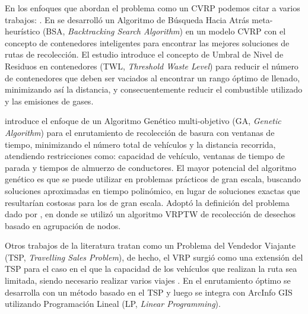 En los enfoques que abordan el problema como un CVRP podemos citar a varios trabajos: \citet{Akhtar2017BacktrackingOptimization,Ombuki-Berman2007WASTEALGORITHMS,Kim2006WasteWindows,Billa2014GISOptimization,Karadimas2007OptimalAlgorithm}. En \citet{Akhtar2017BacktrackingOptimization} se desarrolló un Algoritmo de Búsqueda Hacia Atrás meta-heurístico (BSA, \textit{Backtracking Search Algorithm}) en un modelo CVRP con el concepto de contenedores inteligentes para encontrar las mejores soluciones de rutas de recolección. El estudio introduce \citep{Akhtar2017BacktrackingOptimization, AbdullaAlMamun2015IntegratedAutomation} el concepto de Umbral de Nivel de Residuos en contenedores (TWL, \textit{Threshold Waste Level}) para reducir el número de contenedores que deben ser vaciados al encontrar un rango óptimo de llenado, minimizando así la distancia, y consecuentemente reducir el combustible utilizado y las emisiones de gases.

\citet{Ombuki-Berman2007WASTEALGORITHMS} introduce el enfoque de un Algoritmo Genético multi-objetivo (GA, \textit{Genetic Algorithm}) para el enrutamiento de recolección de basura con ventanas de tiempo, minimizando el número total de vehículos y la distancia recorrida, atendiendo restricciones como: capacidad de vehículo, ventanas de tiempo de parada y tiempos de almuerzo de conductores. El mayor potencial del algoritmo genético es que se puede utilizar en problemas prácticos de gran escala, buscando soluciones aproximadas en tiempo polinómico, en lugar de soluciones exactas que resultarían costosas para los de gran escala. Adoptó la definición del problema dado por \citet{Kim2006WasteWindows}, en donde se utilizó un algoritmo VRPTW de recolección de desechos basado en agrupación de nodos.

Otros trabajos de la literatura tratan como un Problema del Vendedor Viajante (TSP, \textit{Travelling Sales Problem}), de hecho, el VRP surgió como una extensión del TSP para el caso en el que la capacidad de los vehículos que realizan la ruta sea limitada, siendo necesario realizar varios viajes \citep{CalvinoM2011CooperacionPanoramica}. En \citet{Billa2014GISOptimization} el enrutamiento óptimo se desarrolla con un método basado en el TSP y luego se integra con ArcInfo GIS utilizando Programación Lineal (LP, \textit{Linear Programming}). 


